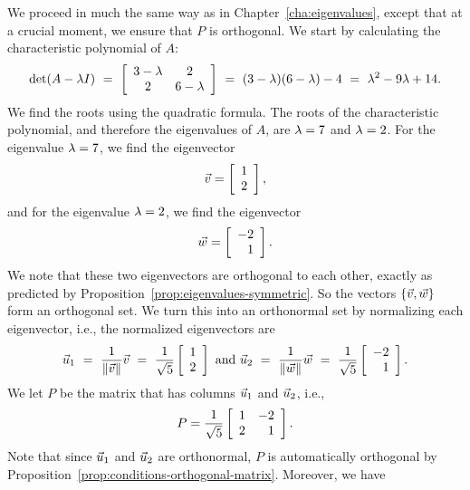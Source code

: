 \documentclass{ximera}
\begin{document}
\begin{solution}
  We proceed in much the same way as in Chapter~\ref{cha:eigenvalues},
  except that at a crucial moment, we ensure that $P$ is orthogonal.
  We start by calculating the characteristic polynomial of $A$:
  \begin{equation*}
    \det(A-\eigenvar I)
    ~=~ \startmat{cc}
      3-\eigenvar & 2 \\
      2 & 6-\eigenvar
    \stopmat
    ~=~ (3-\eigenvar)(6-\eigenvar) - 4
    ~=~ \eigenvar^2 - 9\eigenvar + 14.
  \end{equation*}
  We find the roots using the quadratic formula. The roots of the
  characteristic polynomial, and therefore the eigenvalues of $A$, are
  $\eigenvar=7$ and $\eigenvar=2$. For the eigenvalue $\eigenvar=7$,
  we find the eigenvector
  \begin{equation*}
    \vect{v} = \startmat{r} 1 \\ 2 \stopmat,
  \end{equation*}
  and for the eigenvalue $\eigenvar=2$, we find the eigenvector
  \begin{equation*}
    \vect{w} = \startmat{r} -2 \\ 1 \stopmat.
  \end{equation*}
  We note that these two eigenvectors are orthogonal to each other,
  exactly as predicted by Proposition~\ref{prop:eigenvalues-symmetric}. So
  the vectors $\set{\vect{v},\vect{w}}$ form an orthogonal set. We
  turn this into an orthonormal set by normalizing each eigenvector,
  i.e., the normalized eigenvectors are
  \begin{equation*}
    \vect{u}_1
    ~=~ \frac{1}{\norm{\vect{v}}}\vect{v}
    ~=~ \frac{1}{\sqrt{5}} \startmat{r} 1 \\ 2 \stopmat
    \quad\mbox{and}\quad
    \vect{u}_2
    ~=~ \frac{1}{\norm{\vect{w}}}\vect{w}
    ~=~ \frac{1}{\sqrt{5}} \startmat{r} -2 \\ 1 \stopmat.
  \end{equation*}
  We let $P$ be the matrix that has columns $\vect{u}_1$ and
  $\vect{u}_2$, i.e.,
  \begin{equation*}
    P = \frac{1}{\sqrt{5}} \startmat{rr} 1 & -2 \\ 2 & 1 \stopmat.
  \end{equation*}
  Note that since $\vect{u}_1$ and $\vect{u}_2$ are orthonormal, $P$
  is automatically orthogonal by
  Proposition~\ref{prop:conditions-orthogonal-matrix}. Moreover, we
  have
  \begin{equation*}

\end{equation*}
\end{solution}
\end{document}

